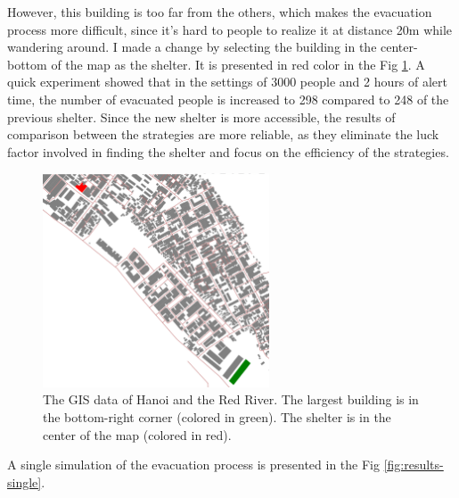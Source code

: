 \documentclass[12pt]{article}
\begin{document}
However, this building is too far from the others, which makes the evacuation process more difficult, since it's hard to people to realize it at distance 20m while wandering around. I made a change by selecting the building in the center-bottom of the map as the shelter. It is presented in red color in the Fig \ref{fig:map}. A quick experiment showed that in the settings of 3000 people and 2 hours of alert time, the number of evacuated people is increased to 298 compared to 248 of the previous shelter. Since the new shelter is more accessible, the results of comparison between the strategies are more reliable, as they eliminate the luck factor involved in finding the shelter and focus on the efficiency of the strategies.\\

\begin{figure}
    \centering
    \includegraphics[width=0.6\textwidth]{../images/map0.png}
    \caption{The GIS data of Hanoi and the Red River. The largest building is in the bottom-right corner (colored in green). The shelter is in the center of the map (colored in red).}
    \label{fig:map}
\end{figure}

A single simulation of the evacuation process is presented in the Fig \ref{fig:results-single}. \\
\end{document}
